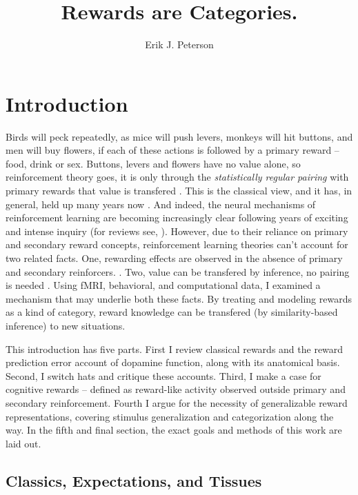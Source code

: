 \documentclass[doc,12pt]{apa}        %
\title{Rewards are Categories.}
\author{Erik J. Peterson} \affiliation{Dept. of Psychology \\ Colorado State University \\ Fort Collins, CO}
\begin{document}
 
\maketitle
\doublespacing
\newpage
\tableofcontents
\newpage
\section{Introduction} %
\label{sec:introduction}
Birds will peck repeatedly, as mice will push levers, monkeys will hit buttons, and men will buy flowers, if each of these actions is followed by a primary reward -- food, drink or sex.  Buttons, levers and flowers have no value alone, so reinforcement theory goes, it is only through the \emph{statistically regular pairing} with primary rewards that value is transfered \cite{Rescorla:1988p8743}.  This is the classical view, and it has, in general, held up many years now \cite{iversen:2007aa}.  And indeed, the neural mechanisms of reinforcement learning are becoming increasingly clear following years of exciting and intense inquiry (for reviews see, ).  However, due to their reliance on primary and secondary reward concepts, reinforcement learning theories can't account for two related facts.  One, rewarding effects are observed in the absence of primary and secondary reinforcers.  \cite{Hayden:2009p6545, Lohrenz:2007p7240, Tricomi:2008p6663, Jimura:2010p8305}. Two, value can be transfered by inference, no pairing is needed \cite{BrombergMartin:2010p7223, Hampton:2006p2577}.  Using fMRI, behavioral, and computational data, I examined a mechanism that may underlie both these facts.  By treating and modeling rewards as a kind of category, reward knowledge can be transfered (by similarity-based inference) to new situations.

This introduction has five parts.  First I review classical rewards and the reward prediction error account of dopamine function, along with its anatomical basis.  Second, I switch hats and critique these accounts. Third, I make a case for cognitive rewards -- defined as reward-like activity observed outside primary and secondary reinforcement. Fourth I argue for the necessity of generalizable reward representations, covering stimulus generalization and categorization along the way.  In the fifth and final section, the exact goals and methods of this work are laid out.

\subsection{Classics, Expectations, and Tissues} %
\label{sub:cet}
\end{document}
